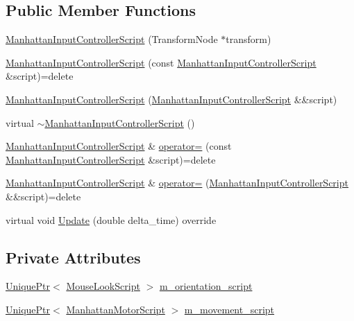 \subsection*{Public Member Functions}
\begin{DoxyCompactItemize}
\item 
\hyperlink{classmage_1_1_manhattan_input_controller_script_a51b746c88210f1ca07711526cb91ec71}{Manhattan\+Input\+Controller\+Script} (Transform\+Node $\ast$transform)
\item 
\hyperlink{classmage_1_1_manhattan_input_controller_script_ad16da80362158de342ecf8d669fbbe15}{Manhattan\+Input\+Controller\+Script} (const \hyperlink{classmage_1_1_manhattan_input_controller_script}{Manhattan\+Input\+Controller\+Script} \&script)=delete
\item 
\hyperlink{classmage_1_1_manhattan_input_controller_script_a5e281b4e16a7b1ead6c31ca742d7d79c}{Manhattan\+Input\+Controller\+Script} (\hyperlink{classmage_1_1_manhattan_input_controller_script}{Manhattan\+Input\+Controller\+Script} \&\&script)
\item 
virtual \hyperlink{classmage_1_1_manhattan_input_controller_script_a3cf134df3084aeffc7ac87a066ecb0c4}{$\sim$\+Manhattan\+Input\+Controller\+Script} ()
\item 
\hyperlink{classmage_1_1_manhattan_input_controller_script}{Manhattan\+Input\+Controller\+Script} \& \hyperlink{classmage_1_1_manhattan_input_controller_script_a07fdb2fee8a1eb793c2d54853c9e4998}{operator=} (const \hyperlink{classmage_1_1_manhattan_input_controller_script}{Manhattan\+Input\+Controller\+Script} \&script)=delete
\item 
\hyperlink{classmage_1_1_manhattan_input_controller_script}{Manhattan\+Input\+Controller\+Script} \& \hyperlink{classmage_1_1_manhattan_input_controller_script_acea874b94a4531c393af739824012a1a}{operator=} (\hyperlink{classmage_1_1_manhattan_input_controller_script}{Manhattan\+Input\+Controller\+Script} \&\&script)=delete
\item 
virtual void \hyperlink{classmage_1_1_manhattan_input_controller_script_adfd98377642722fae5db6e005b2c6c3e}{Update} (double delta\+\_\+time) override
\end{DoxyCompactItemize}
\subsection*{Private Attributes}
\begin{DoxyCompactItemize}
\item 
\hyperlink{namespacemage_a8c307fbcc33bce9b7f2aa4c26c3b95cf}{Unique\+Ptr}$<$ \hyperlink{classmage_1_1_mouse_look_script}{Mouse\+Look\+Script} $>$ \hyperlink{classmage_1_1_manhattan_input_controller_script_add3be278d93719ba235d4606d555bd2a}{m\+\_\+orientation\+\_\+script}
\item 
\hyperlink{namespacemage_a8c307fbcc33bce9b7f2aa4c26c3b95cf}{Unique\+Ptr}$<$ \hyperlink{classmage_1_1_manhattan_motor_script}{Manhattan\+Motor\+Script} $>$ \hyperlink{classmage_1_1_manhattan_input_controller_script_ad3b6525bba021f03c17d2de6f5e54101}{m\+\_\+movement\+\_\+script}
\end{DoxyCompactItemize}

